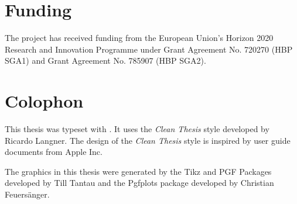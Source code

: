 \section*{Funding}
The project has received funding from the European Union’s Horizon 2020 Research and Innovation Programme under Grant Agreement No. 720270 (HBP SGA1) and Grant Agreement No. 785907 (HBP SGA2).
% 
\section*{Colophon}
This thesis was typeset with \LaTeXe.
It uses the \textit{Clean Thesis} style developed by Ricardo Langner.
The design of the \textit{Clean Thesis} style is inspired by user guide documents from Apple Inc.
\par
The graphics in this thesis were generated by the Tikz and PGF Packages developed by Till Tantau and the Pgfplots package developed by Christian Feuers{\"a}nger.